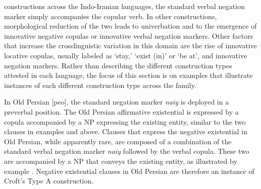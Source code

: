 \documentclass[output=paper,colorlinks,citecolor=brown]{langscibook}
\begin{document}
constructions across the Indo-Iranian languages, the standard verbal
negation marker simply accompanies the copular verb. In other
constructions, morphological reduction of the two leads to univerbation and
to the emergence of innovative negative copulas or innovative verbal
negation markers. Other factors that increase the crosslinguistic variation
in this domain are the rise of innovative locative copulas, usually labeled
as `stay,' `exist (in)' or `be at', and innovative negation markers.
Rather than describing the different construction types attested in each
language, the focus of this section is on examples that illustrate
instances of each different construction type across the family.

In Old Persian [peo], the standard negation marker \textit{naiy} is
deployed in a preverbal position. The Old Persian affirmative existential
is expressed by a copula accompanied by a NP expressing the existing
entity, similar to the two clauses in examples 
and  above. Clauses that express the
negative existential in
Old Persian, while apparently rare, are composed of a combination of the
standard verbal negation marker \textit{naiy} followed by the verbal
copula. These two are accompanied by a NP that conveys the existing entity,
as illustrated by example . Negative
existential clauses in Old Persian are therefore an instance of Croft's
Type A construction.
%
\begin{exe}
\end{exe}
\end{document}
